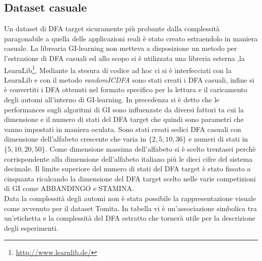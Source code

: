 \subsection{Dataset casuale}
Un dataset di \ac{DFA} target sicuramente più probante dalla complessità paragonabile a quella delle applicazioni reali è stato creato estraendolo in maniera casuale. La librearia GI-learning non metteva a disposizione un metodo per l'estrazione di \ac{DFA} casuali ed allo scopo si è utilizzata una libreria esterna ,la LearnLib\footnote{\href{http://www.learnlib.de/}{http://www.learnlib.de/}}. Mediante la stesura di codice ad hoc ci si è interfecciati con la LearnLib e con il metodo \textit{randomICDFA} sono stati creati i \ac{DFA} casuali, infine si è convertiti i \ac{DFA} ottenuti nel formato specifico per la lettura e il caricamento degli automi all'interno di GI-learning. 
In precedenza si è detto che le performances sugli algoritmi di  \ac{GI} sono influenzate da diversi fattori ta cui la dimensione e il numero di stati del \ac{DFA} target che quindi sono parametri che vanno impostati in maniera oculata.
Sono stati creati sedici \ac{DFA} casuali con dimensione dell'alfabeto crescente che varia in $\{2,5,10,36\}$ e numeri di stati in $\{5,10,20,50\}$. Come dimensione massima dell'alfabeto si è scelto trentasei perchè corrispondente alla dimensione dell'alfabeto italiano più le dieci cifre del sistema decimale. Il limite superiore del numero di stati del \ac{DFA} target è stato fissato a cinquanta ricalcando la dimensione del \ac{DFA} target scelto   nelle varie competizioni di \ac{GI} come ABBANDINGO e STAMINA.\\
Data la complessità degli automi non è stata possibile la rappresentazione visuale come avvenuto per il dataset Tomita.  In tabella vi è un'associazione simbolica tra un'etichetta e la complessità del \ac{DFA} estratto che tornerà utile per la descrizione degli esperimenti.

